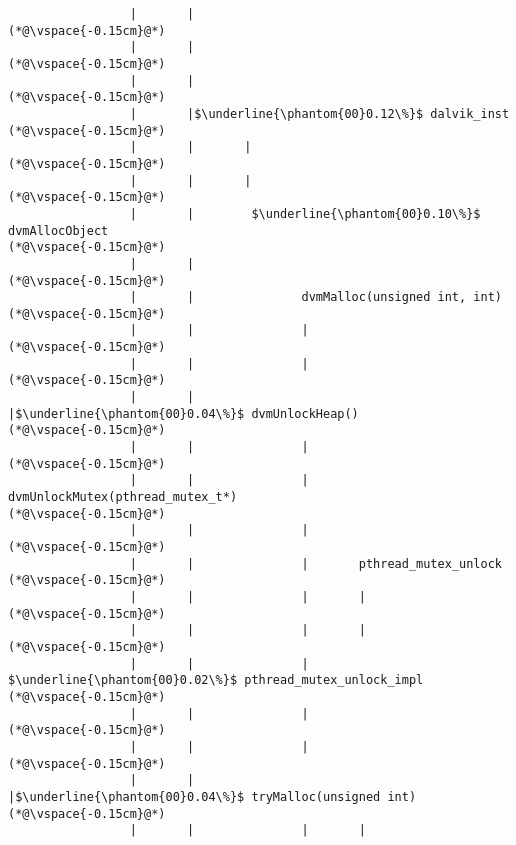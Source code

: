 \begin{lstlisting}
                 |       |
(*@\vspace{-0.15cm}@*)
                 |       |
(*@\vspace{-0.15cm}@*)
                 |       |
(*@\vspace{-0.15cm}@*)
                 |       |$\underline{\phantom{00}0.12\%}$ dalvik_inst
(*@\vspace{-0.15cm}@*)
                 |       |       |
(*@\vspace{-0.15cm}@*)
                 |       |       |
(*@\vspace{-0.15cm}@*)
                 |       |        $\underline{\phantom{00}0.10\%}$ dvmAllocObject
(*@\vspace{-0.15cm}@*)
                 |       |
(*@\vspace{-0.15cm}@*)
                 |       |               dvmMalloc(unsigned int, int)
(*@\vspace{-0.15cm}@*)
                 |       |               |
(*@\vspace{-0.15cm}@*)
                 |       |               |
(*@\vspace{-0.15cm}@*)
                 |       |               |$\underline{\phantom{00}0.04\%}$ dvmUnlockHeap()
(*@\vspace{-0.15cm}@*)
                 |       |               |
(*@\vspace{-0.15cm}@*)
                 |       |               |       dvmUnlockMutex(pthread_mutex_t*)
(*@\vspace{-0.15cm}@*)
                 |       |               |
(*@\vspace{-0.15cm}@*)
                 |       |               |       pthread_mutex_unlock
(*@\vspace{-0.15cm}@*)
                 |       |               |       |
(*@\vspace{-0.15cm}@*)
                 |       |               |       |
(*@\vspace{-0.15cm}@*)
                 |       |               |        $\underline{\phantom{00}0.02\%}$ pthread_mutex_unlock_impl
(*@\vspace{-0.15cm}@*)
                 |       |               |
(*@\vspace{-0.15cm}@*)
                 |       |               |
(*@\vspace{-0.15cm}@*)
                 |       |               |$\underline{\phantom{00}0.04\%}$ tryMalloc(unsigned int)
(*@\vspace{-0.15cm}@*)
                 |       |               |       |

\end{lstlisting}
